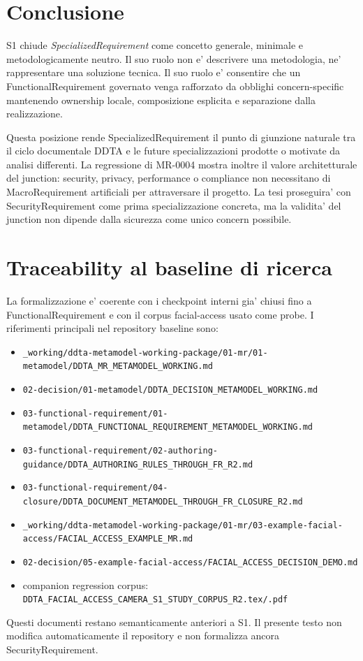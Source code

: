 \documentclass[11pt,a4paper]{article}
\begin{document}
\section{Conclusione}

S1 chiude \emph{SpecializedRequirement} come concetto generale, minimale e metodologicamente neutro. Il suo ruolo non e' descrivere una metodologia, ne' rappresentare una soluzione tecnica. Il suo ruolo e' consentire che un FunctionalRequirement governato venga rafforzato da obblighi concern-specific mantenendo ownership locale, composizione esplicita e separazione dalla realizzazione.

Questa posizione rende SpecializedRequirement il punto di giunzione naturale tra il ciclo documentale DDTA e le future specializzazioni prodotte o motivate da analisi differenti. La regressione di MR-0004 mostra inoltre il valore architetturale del junction: security, privacy, performance o compliance non necessitano di MacroRequirement artificiali per attraversare il progetto. La tesi proseguira' con SecurityRequirement come prima specializzazione concreta, ma la validita' del junction non dipende dalla sicurezza come unico concern possibile.

\appendix
\section{Traceability al baseline di ricerca}

La formalizzazione e' coerente con i checkpoint interni gia' chiusi fino a FunctionalRequirement e con il corpus facial-access usato come probe. I riferimenti principali nel repository baseline sono:

{\small
\begin{itemize}
  \item \nolinkurl{_working/ddta-metamodel-working-package/01-mr/01-metamodel/DDTA_MR_METAMODEL_WORKING.md}
  \item \nolinkurl{02-decision/01-metamodel/DDTA_DECISION_METAMODEL_WORKING.md}
  \item \nolinkurl{03-functional-requirement/01-metamodel/DDTA_FUNCTIONAL_REQUIREMENT_METAMODEL_WORKING.md}
  \item \nolinkurl{03-functional-requirement/02-authoring-guidance/DDTA_AUTHORING_RULES_THROUGH_FR_R2.md}
  \item \nolinkurl{03-functional-requirement/04-closure/DDTA_DOCUMENT_METAMODEL_THROUGH_FR_CLOSURE_R2.md}
  \item \nolinkurl{_working/ddta-metamodel-working-package/01-mr/03-example-facial-access/FACIAL_ACCESS_EXAMPLE_MR.md}
  \item \nolinkurl{02-decision/05-example-facial-access/FACIAL_ACCESS_DECISION_DEMO.md}
  \item companion regression corpus: \nolinkurl{DDTA_FACIAL_ACCESS_CAMERA_S1_STUDY_CORPUS_R2.tex/.pdf}
\end{itemize}
}

Questi documenti restano semanticamente anteriori a S1. Il presente testo non modifica automaticamente il repository e non formalizza ancora SecurityRequirement.
\end{document}
